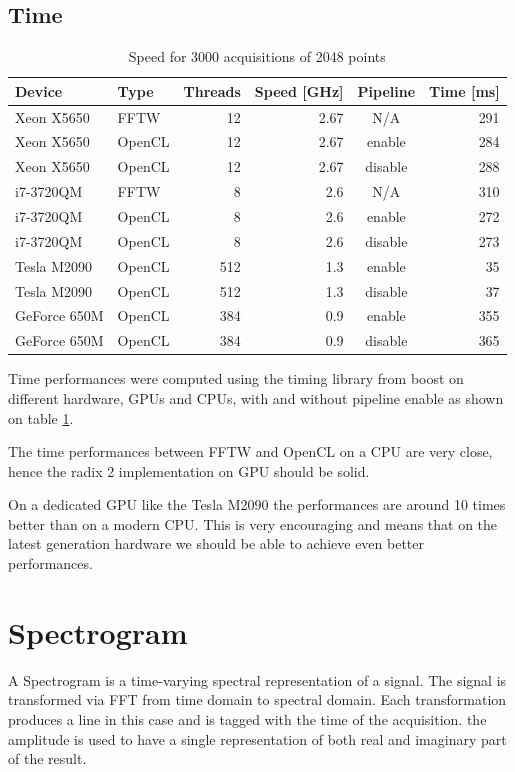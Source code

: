 \subsection{Time}

\begin{table}[H]
\caption{Speed for 3000 acquisitions of 2048 points}
\centering
\label{tab:speed}
\begin{tabular}{|l|lrrcr|}
\hline
Device & Type & Threads & Speed [GHz] & Pipeline & Time [ms] \\
\hline
\hline
Xeon X5650 & FFTW & 12 & 2.67 & N/A & 291 \\
Xeon X5650 & OpenCL & 12 & 2.67 & enable & 284 \\
Xeon X5650 & OpenCL & 12 & 2.67 & disable & 288 \\
\hline
i7-3720QM & FFTW & 8 & 2.6 & N/A & 310 \\
i7-3720QM & OpenCL & 8 & 2.6 & enable & 272 \\
i7-3720QM & OpenCL & 8 & 2.6 & disable & 273 \\
\hline
\hline
Tesla M2090 & OpenCL & 512 & 1.3 & enable & 35 \\
Tesla M2090 & OpenCL & 512 & 1.3 & disable & 37 \\
\hline
GeForce 650M & OpenCL & 384 & 0.9 & enable & 355 \\
GeForce 650M & OpenCL & 384 & 0.9 & disable & 365 \\
\hline
\end{tabular}
\end{table}

Time performances were computed using the timing library from boost \cite{boost} on different hardware, \glspl{GPU} and \glspl{CPU}, with and without pipeline enable as shown on table \ref{tab:speed}.

The time performances between \gls{FFTW} and \gls{OpenCL} on a \gls{CPU} are very close, hence the radix 2 implementation on \gls{GPU} should be solid.

On a dedicated \gls{GPU} like the Tesla M2090  the performances are around 10 times better than on a modern \gls{CPU}. This is very encouraging and means that on the latest generation hardware we should be able to achieve even better performances.

\section{Spectrogram}
\label{sec:spectrogram}

A Spectrogram is a time-varying spectral representation of a signal. The signal is transformed via \gls{FFT} from time domain to spectral domain. Each transformation produces a line in this case and is tagged with the time of the acquisition. the amplitude is used to have a single representation of both real and imaginary part of the result.

